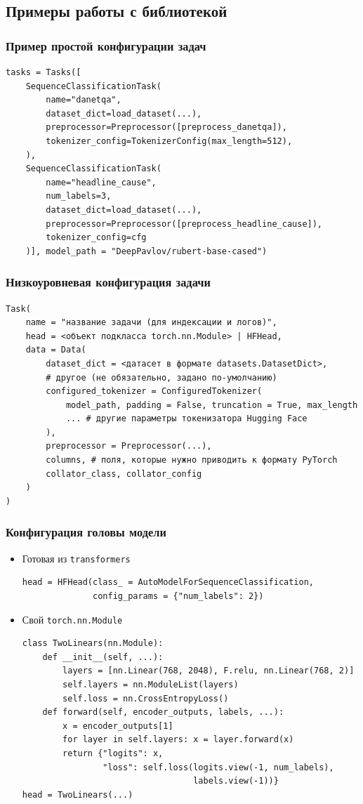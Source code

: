 \documentclass[aspectratio=169]{beamer}
\begin{document}
\subsection{Примеры работы с библиотекой}

\begin{frame}[fragile]
	\frametitle{Пример простой конфигурации задач}
	\begin{verbatim}
tasks = Tasks([
	SequenceClassificationTask(
	    name="danetqa",
	    dataset_dict=load_dataset(...),
	    preprocessor=Preprocessor([preprocess_danetqa]),
	    tokenizer_config=TokenizerConfig(max_length=512),
	), 
	SequenceClassificationTask(
	    name="headline_cause",
	    num_labels=3,
	    dataset_dict=load_dataset(...),
	    preprocessor=Preprocessor([preprocess_headline_cause]),
	    tokenizer_config=cfg
	)], model_path = "DeepPavlov/rubert-base-cased")
	\end{verbatim}
\end{frame}

\begin{frame}[fragile]
	\frametitle{Низкоуровневая конфигурация задачи}
	\begin{verbatim}
Task(
    name = "название задачи (для индексации и логов)",
    head = <объект подкласса torch.nn.Module> | HFHead,
    data = Data(
        dataset_dict = <датасет в формате datasets.DatasetDict>,
        # другое (не обязательно, задано по-умолчанию)
        configured_tokenizer = ConfiguredTokenizer(
            model_path, padding = False, truncation = True, max_length
            ... # другие параметры токенизатора Hugging Face
        ),
        preprocessor = Preprocessor(...),
        columns, # поля, которые нужно приводить к формату PyTorch
        collator_class, collator_config
    )
)
	\end{verbatim}
\end{frame}

\begin{frame}[fragile]
	\frametitle{Конфигурация головы модели}
	\begin{itemize}
		\item Готовая из \texttt{transformers}
		\begin{verbatim}
head = HFHead(class_ = AutoModelForSequenceClassification,
              config_params = {"num_labels": 2})
		\end{verbatim}
		\item Свой \texttt{torch.nn.Module}
		\begin{verbatim}
class TwoLinears(nn.Module):
    def __init__(self, ...):
        layers = [nn.Linear(768, 2048), F.relu, nn.Linear(768, 2)]
        self.layers = nn.ModuleList(layers)
        self.loss = nn.CrossEntropyLoss()
    def forward(self, encoder_outputs, labels, ...):
        x = encoder_outputs[1]
        for layer in self.layers: x = layer.forward(x)
        return {"logits": x, 
                "loss": self.loss(logits.view(-1, num_labels), 
                                  labels.view(-1))}
head = TwoLinears(...)
		\end{verbatim}
	\end{itemize}
\end{frame}
\end{document}
